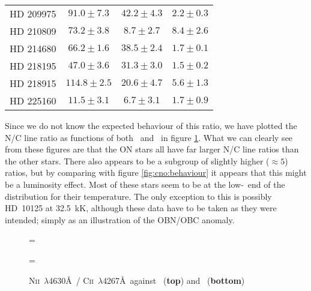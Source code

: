 \begin{table}
\begin{center}
\begin{tabular}{lccc}
  HD 209975 & $ 91.0 \pm  7.3$ & $ 42.2\pm  4.3$ & $  2.2 \pm  0.3$ \\
  HD 210809 & $ 73.2 \pm  3.8$ & $  8.7\pm  2.7$ & $  8.4 \pm  2.6$ \\
  HD 214680 & $ 66.2 \pm  1.6$ & $ 38.5\pm  2.4$ & $  1.7 \pm  0.1$ \\
  HD 218195 & $ 47.0 \pm  3.6$ & $ 31.3\pm  3.0$ & $  1.5 \pm  0.2$ \\
  HD 218915 & $114.8 \pm  2.5$ & $ 20.6\pm  4.7$ & $  5.6 \pm  1.3$ \\
  HD 225160 & $ 11.5 \pm  3.1$ & $  6.7\pm  3.1$ & $  1.7 \pm  0.9$ \\
\hline\hline
\end{tabular}
\end{center}
\label{ta:cn_ew}
\end{table} %

Since we do not know the expected behaviour of this ratio, we have
plotted the N/C line ratio as functions of both \teff\ and \logg\ in figure
\ref{fig:cno:tg}. What we can clearly see from these figures are that
the ON stars all have far larger N/C line ratios than the other stars.
There also appears to be a subgroup of slightly higher ($\approx 5$)
ratios, but by comparing with figure \ref{fig:cno:behaviour} it
appears that this might be a luminosity effect. Most of these stars
seem to be at the low-\logg\ end of the distribution for their
temperature. The only exception to this is possibly HD~10125 at
32.5~kK, although these data have to be taken as they were intended;
simply as an illustration of the OBN/OBC anomaly.

\begin{figure} %
\epsfxsize=\figwidth
\setlength{\cen}{(\textwidth / 2) - (\epsfxsize / 2)}
\hspace{\cen}

\epsfxsize=\figwidth
\setlength{\cen}{(\textwidth / 2) - (\epsfxsize / 2)}
\hspace{\cen}

\caption[N\textsc{ii}~$\lambda$4630\AA\ /
C\textsc{ii}~$\lambda$4267\AA\ against \teff\ and \logg]
{\fcfont N\textsc{ii}~$\lambda$4630\AA\ /
C\textsc{ii}~$\lambda$4267\AA\ against \teff\ (\textbf{top}) and \logg\
(\textbf{bottom})}
\label{fig:cno:tg}
\end{figure}   %

